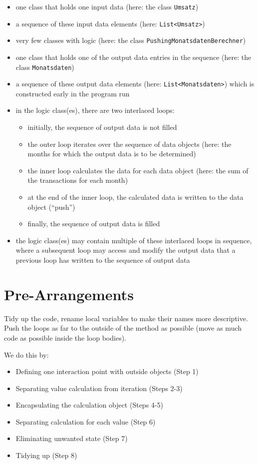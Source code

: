 \documentclass[a4paper,fleqn,titlepage,11pt]{article}
\begin{document}
\begin{itemize}
\item one class that holds one input data (here: the class \texttt{Umsatz})
\item a sequence of these input data elements (here: \texttt{List<Umsatz>})
\item very few classes with logic (here: the class \texttt{PushingMonatsdatenBerechner})
\item one class that holds one of the output data entries in the sequence (here: the class \texttt{Monatsdaten})
\item a sequence of these output data elements (here: \texttt{List<Monatsdaten>}) which is constructed early in the program run
\item in the logic class(es), there are two interlaced loops: 
\begin{itemize}
\item initially, the sequence of output data is not filled
\item the outer loop iterates over the sequence of data objects (here: the months for which the output data is to be determined)
\item the inner loop calculates the data for each data object (here: the sum of the transactions for each month)
\item at the end of the inner loop, the calculated data is written to the data object (``push'')
\item finally, the sequence of output data is filled
\end{itemize}
\item the logic class(es) may contain multiple of these interlaced loops in sequence, where a subsequent loop may access and modify the output data that a previous loop has written to the sequence of output data
\end{itemize}

\section{Pre-Arrangements}

Tidy up the code, rename local variables to make their names more descriptive.
Push the loops as far to the outside of the method as possible (move as much code as possible inside the loop bodies).

We do this by:
\begin{itemize}
	\item Defining one interaction point with outside objects (Step 1)
	\item Separating value calculation from iteration (Steps 2-3)
	\item Encapsulating the calculation object (Steps 4-5)
	\item Separating calculation for each value (Step 6)
	\item Eliminating unwanted state (Step 7)
	\item Tidying up (Step 8)
\end{itemize}
\end{document}
